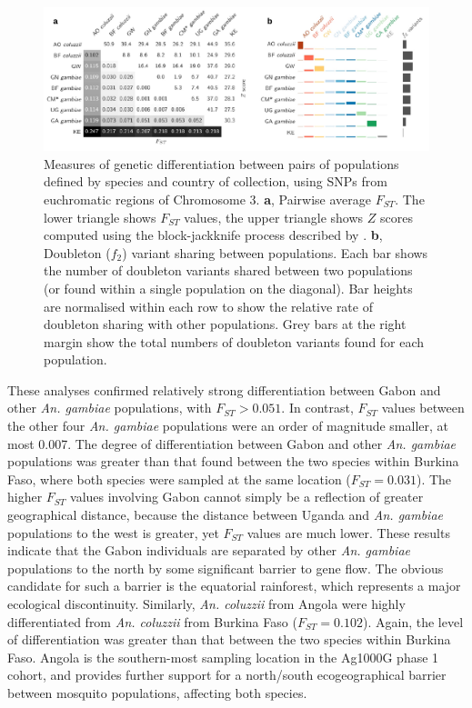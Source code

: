 \begin{refsection}
\begin{figure}[t!]
\centering
\includegraphics[width=1.1\textwidth,center]{artwork/chapter4/popdiff.pdf}
\caption{Measures of genetic differentiation between pairs of populations defined by species and country of collection, using SNPs from euchromatic regions of Chromosome 3.
%
\textbf{a}, Pairwise average $F_{ST}$.
%
The lower triangle shows $F_{ST}$ values, the upper triangle shows $Z$ scores computed using the block-jackknife process described by \textcite{Bhatia2013}.
%
\textbf{b}, Doubleton ($f_2$) variant sharing between populations.
%
Each bar shows the number of doubleton variants shared between two populations (or found within a single population on the diagonal).
%
Bar heights are normalised within each row to show the relative rate of doubleton sharing with other populations.
%
Grey bars at the right margin show the total numbers of doubleton variants found for each population.
%
}
\label{fig:popdiff}
\end{figure}


These analyses confirmed relatively strong differentiation between Gabon and other \textit{An. gambiae} populations, with $F_{ST} > 0.051$.
%
In contrast, $F_{ST}$ values between the other four \textit{An. gambiae} populations were an order of magnitude smaller, at most 0.007.
%
The degree of differentiation between Gabon and other \textit{An. gambiae} populations was greater than that found between the two species within Burkina Faso, where both species were sampled at the same location ($F_{ST} = 0.031$).
%
The higher $F_{ST}$ values involving Gabon cannot simply be a reflection of greater geographical distance, because the distance between Uganda and \textit{An. gambiae} populations to the west is greater, yet $F_{ST}$ values are much lower.
%
These results indicate that the Gabon individuals are separated by other \textit{An. gambiae} populations to the north by some significant barrier to gene flow.
%
The obvious candidate for such a barrier is the equatorial rainforest, which represents a major ecological discontinuity.
%
Similarly, \textit{An. coluzzii} from Angola were highly differentiated from \textit{An. coluzzii} from Burkina Faso ($F_{ST} = 0.102$).
%
Again, the level of differentiation was greater than that between the two species within Burkina Faso.
%
Angola is the southern-most sampling location in the Ag1000G phase 1 cohort, and provides further support for a north/south ecogeographical barrier between mosquito populations, affecting both species.



\end{refsection}
